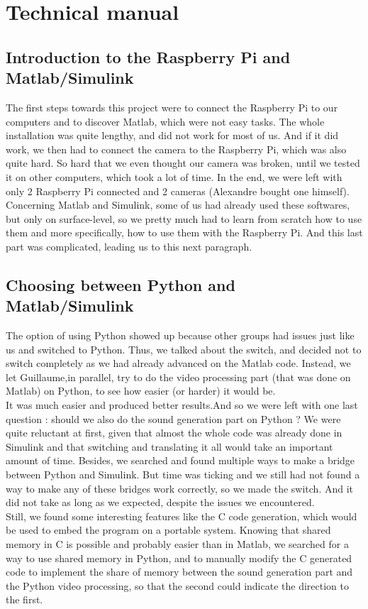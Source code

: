 \documentclass{rapport}
\begin{document}
\section{Technical manual}

\subsection{Introduction to the Raspberry Pi and Matlab/Simulink
}
    
The first steps towards this project were to connect the Raspberry Pi to our computers and to discover Matlab, which were not easy tasks.
The whole installation was quite lengthy, and did not work for most of us. And if it did work, we then had to connect the camera to the Raspberry Pi, which was also quite hard. So hard that we even thought our camera was broken, until we tested it on other computers, which took a lot of time. In the end, we were left with only 2 Raspberry Pi connected and 2 cameras (Alexandre bought one himself).\\
Concerning Matlab and Simulink, some of us had already used these softwares, but only on surface-level, so we pretty much had to learn from scratch how to use them and more specifically, how to use them with the Raspberry Pi. And this last part was complicated, leading us to this next paragraph.

\subsection{Choosing between Python and Matlab/Simulink
}

The option of using Python showed up because other groups had issues just like us and switched to Python. Thus, we talked about the switch, and decided not to switch completely as we had already advanced on the Matlab code. Instead, we let Guillaume,in parallel, try to do the video processing part (that was done on Matlab) on Python, to see how easier (or harder) it would be.\\
It was much easier and produced better results.And so we were left with one last question : should we also do the sound generation part on Python ?
We were quite reluctant at first, given that almost the whole code was already done in Simulink and that switching and translating it all would take an important amount of time. Besides, we searched and found multiple ways to make a bridge between Python and Simulink. But time was ticking and we still had not found a way to make any of these bridges work correctly, so we made the switch. And it did not take as long as we expected, despite the issues we encountered. \\
Still, we found some interesting features like the C code generation, which would be used to embed the program on a portable system. Knowing that shared memory in C is possible and probably easier than in Matlab, we searched for a way to use shared memory in Python, and to manually modify the C generated code to implement the share of memory between the sound generation part and the Python video processing, so that the second could indicate the direction to the first.\\
\end{document}
